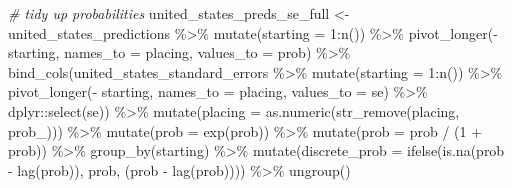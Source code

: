 \documentclass[
]{book}
\newenvironment{Shaded}{\begin{snugshade}}{\end{snugshade}}
\newcommand{\AttributeTok}[1]{\textcolor[rgb]{0.77,0.63,0.00}{#1}}
\newcommand{\CommentTok}[1]{\textcolor[rgb]{0.56,0.35,0.01}{\textit{#1}}}
\newcommand{\DecValTok}[1]{\textcolor[rgb]{0.00,0.00,0.81}{#1}}
\newcommand{\FunctionTok}[1]{\textcolor[rgb]{0.00,0.00,0.00}{#1}}
\newcommand{\NormalTok}[1]{#1}
\newcommand{\OtherTok}[1]{\textcolor[rgb]{0.56,0.35,0.01}{#1}}
\newcommand{\SpecialCharTok}[1]{\textcolor[rgb]{0.00,0.00,0.00}{#1}}
\newcommand{\StringTok}[1]{\textcolor[rgb]{0.31,0.60,0.02}{#1}}
\begin{document}
\begin{Shaded}
\begin{Highlighting}[]
\CommentTok{\# tidy up probabilities}
\NormalTok{united\_states\_preds\_se\_full }\OtherTok{\textless{}{-}}\NormalTok{ united\_states\_predictions }\SpecialCharTok{\%\textgreater{}\%}
  \FunctionTok{mutate}\NormalTok{(}\AttributeTok{starting =} \DecValTok{1}\SpecialCharTok{:}\FunctionTok{n}\NormalTok{()) }\SpecialCharTok{\%\textgreater{}\%}
  \FunctionTok{pivot\_longer}\NormalTok{(}\SpecialCharTok{{-}}\NormalTok{ starting, }\AttributeTok{names\_to =} \StringTok{\textquotesingle{}placing\textquotesingle{}}\NormalTok{, }\AttributeTok{values\_to =} \StringTok{\textquotesingle{}prob\textquotesingle{}}\NormalTok{) }\SpecialCharTok{\%\textgreater{}\%} 
  \FunctionTok{bind\_cols}\NormalTok{(united\_states\_standard\_errors }\SpecialCharTok{\%\textgreater{}\%} \FunctionTok{mutate}\NormalTok{(}\AttributeTok{starting =} \DecValTok{1}\SpecialCharTok{:}\FunctionTok{n}\NormalTok{()) }\SpecialCharTok{\%\textgreater{}\%}
  \FunctionTok{pivot\_longer}\NormalTok{(}\SpecialCharTok{{-}}\NormalTok{ starting, }\AttributeTok{names\_to =} \StringTok{\textquotesingle{}placing\textquotesingle{}}\NormalTok{, }\AttributeTok{values\_to =} \StringTok{\textquotesingle{}se\textquotesingle{}}\NormalTok{) }\SpecialCharTok{\%\textgreater{}\%}
\NormalTok{    dplyr}\SpecialCharTok{::}\FunctionTok{select}\NormalTok{(se)) }\SpecialCharTok{\%\textgreater{}\%}
  \FunctionTok{mutate}\NormalTok{(}\AttributeTok{placing =} \FunctionTok{as.numeric}\NormalTok{(}\FunctionTok{str\_remove}\NormalTok{(placing, }\StringTok{\textquotesingle{}prob\_\textquotesingle{}}\NormalTok{))) }\SpecialCharTok{\%\textgreater{}\%}
  \FunctionTok{mutate}\NormalTok{(}\AttributeTok{prob =} \FunctionTok{exp}\NormalTok{(prob)) }\SpecialCharTok{\%\textgreater{}\%}
  \FunctionTok{mutate}\NormalTok{(}\AttributeTok{prob =}\NormalTok{ prob }\SpecialCharTok{/}\NormalTok{ (}\DecValTok{1} \SpecialCharTok{+}\NormalTok{ prob)) }\SpecialCharTok{\%\textgreater{}\%}
  \FunctionTok{group\_by}\NormalTok{(starting) }\SpecialCharTok{\%\textgreater{}\%} 
  \FunctionTok{mutate}\NormalTok{(}\AttributeTok{discrete\_prob =} \FunctionTok{ifelse}\NormalTok{(}\FunctionTok{is.na}\NormalTok{(prob }\SpecialCharTok{{-}} \FunctionTok{lag}\NormalTok{(prob)), prob, (prob }\SpecialCharTok{{-}} \FunctionTok{lag}\NormalTok{(prob)))) }\SpecialCharTok{\%\textgreater{}\%}
  \FunctionTok{ungroup}\NormalTok{()}


\end{Highlighting}
\end{Shaded}
\end{document}
